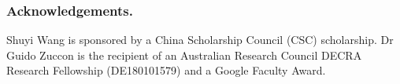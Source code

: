 \documentclass[runningheads]{llncs}
\begin{document}







\makeatletter
\renewcommand{\@biblabel}[1]{\hfill #1.}
\makeatother

\subsubsection*{Acknowledgements.} Shuyi Wang is sponsored by a China Scholarship Council (CSC) scholarship. Dr Guido Zuccon is the recipient of an Australian Research Council DECRA Research Fellowship (DE180101579) and a Google Faculty Award. 



\end{document}
